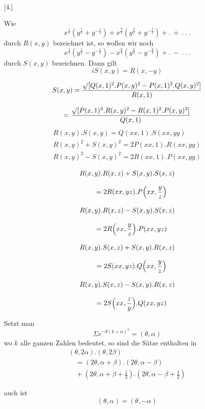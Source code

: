 \par\medskip{}\centerline{[4.]}\nobreak\smallskip
Wie
\[
x^{\frac14}(y^{\frac12}+y^{-\frac12})+x^{\frac94}(y^{\frac32}+y^{-\frac32})+.\ +\ .\ .\ .
\]
durch $R(x,y)$ bezeichnet ist, so wollen wir noch
\[
x^{\frac14}(y^{\frac12}-y^{-\frac12})-x^{\frac94}(y^{\frac32}-y^{-\frac32})+.\ -\ .\ .\ .
\]
durch $S(x,y)$ bezeichnen. Dann gilt
\[
iS(x,y)=R(x,-y)
\]

\[
\begin{gathered}
S(x,y)=\frac{\surd[Q(x,1)^2.P(x,y)^2-P(x,1)^2.Q(x,y)^2]}{R(x,1)}\\[8pt]
=\frac{\surd[P(x,1)^2.R(x,y)^2-R(x,1)^2.P(x,y)^2]}{Q(x,1)}
\end{gathered}
\]
\[
\begin{gathered}
R(x,y).S(x,y)=Q(xx,1).S(xx,yy)\\[8pt]
R(x,y)^2+S(x,y)^2=2P(xx,1).R(xx,yy)\\[8pt]
R(x,y)^2-S(x,y)^2=2R(xx,1).P(xx,yy)
\end{gathered}
\]

\[
\begin{gathered}
R(x,y).R(x,z)+S(x,y).S(x,z)\\[8pt]\quad{}=2R(xx,yz).P\Bigl(xx,\frac yz\Bigr)\\[8pt]
R(x,y).R(x,z)-S(x,y).S(x,z)\\[8pt]\quad{}=2R\Bigl(xx,\frac yz\Bigr).P(xx,yz)\\[8pt]
R(x,y).S(x,z)+S(x,y).R(x,z)\\[8pt]\quad{}=2S(xx,yz).Q\Bigl(xx,\frac yz\Bigr)\\[8pt]
R(x,y).S(x,z)-S(x,y).R(x,z)\\[8pt]\quad{}=2S\Bigl(xx,\frac zy\Bigr).Q(xx,yz)
\end{gathered}
\]

Setzt man
\[
\Sigma e^{-\theta(k+\alpha)^2}=(\theta,\alpha)
\]
wo $k$ alle ganzen Zahlen bedeutet, so sind die Sätze enthalten in
\[
\begin{gathered}(\theta,2\alpha).(\theta,2\beta)
\\[8pt]\quad{}=(2\theta,\alpha+\beta).(2\theta,\alpha-\beta)
\\[8pt]\quad{}+(2\theta,\alpha+\beta+\tfrac12).(2\theta,\alpha-\beta+\tfrac12)\end{gathered}
\]



\providecommand{\GaussCircleArrow}{\ensuremath{\mathord{\vcenter{\hbox{\setlength{\unitlength}{1pt}\begin{picture}(10,11)\linethickness{.55pt}\put(3.3,3.3){\circle{5.2}}\put(5.1,5.1){\line(1,1){3.2}}\put(5.6,8.3){\line(1,0){2.7}}\put(8.3,5.6){\line(0,1){2.7}}\end{picture}}}}}}

auch ist
\[
(\theta,\alpha)=(\theta,-\alpha)
\]
\clearpage
\endgroup
